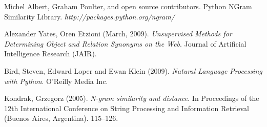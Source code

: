 \documentclass{article}
\begin{document}
\begin{thebibliography}{1}

Michel Albert, Graham Poulter, and open source contributors. Python NGram Similarity Library. \textit{http://packages.python.org/ngram/}

Alexander Yates, Oren Etzioni (March, 2009). \textit{Unsupervised Methods for Determining Object and Relation Synonyms on the Web}. Journal of Artificial Intelligence Research (JAIR). 

Bird, Steven, Edward Loper and Ewan Klein (2009). \textit{Natural Language Processing with Python}.  O'Reilly Media Inc.

Kondrak, Grzegorz (2005). \textit{N-gram similarity and distance}. In Proceedings of the 12th International Conference on String Processing and Information Retrieval (Buenos Aires, Argentina). 115–126.

\end{thebibliography}
\end{document}

